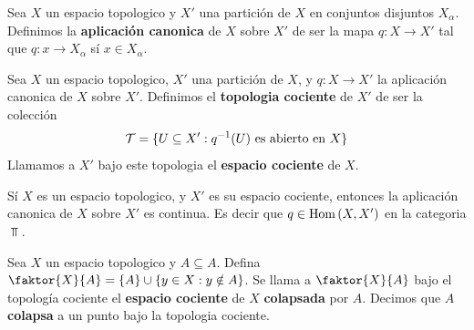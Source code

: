 \begin{definition}
    Sea $X$ un espacio topologico y $X'$ una partici\'on de $X$ en conjuntos
    disjuntos  $X_\alpha$. Definimos la  \textbf{aplicaci\'on canonica} de $X$
    sobre  $X'$ de ser la mapa $q:X \xrightarrow{} X'$ tal que $q:x \xrightarrow{}
    X_\alpha$ s\'i $x \in X_\alpha$.
\end{definition}

\begin{definition}
    Sea $X$ un espacio topologico,  $X'$ una partici\'on de  $X$, y  $q:X
    \xrightarrow{} X'$ la aplicaci\'on canonica de $X$ sobre $X'$. Definimos el
    \textbf{topologia cociente} de $X'$ de ser la colecci\'on
    \begin{equation*}
        \mathcal{T}=\{U \subseteq X' : q^{-1}(U) \text{ es abierto en } X\}
    \end{equation*}
    Llamamos a $X'$ bajo este topologia el  \textbf{espacio cociente} de $X$.
\end{definition}

\begin{lemma}\label{lemma_8.14}
    S\'i $X$ es un espacio topologico, y  $X'$ es su espacio cociente, entonces
    la aplicaci\'on canonica de  $X$ sobre  $X'$ es continua. Es decir que $q
    \in \operatorname{Hom}{(X,X')}$ en la categoria $\Top$.
\end{lemma}

\begin{definition}
    Sea $X$ un espacio topologico y  $A \subseteq A$. Defina
    $\faktor{X}{A}=\{A\} \cup \{y \in X : y \notin A\}$. Se llama a
    $\faktor{X}{A}$ bajo el topolog\'ia cociente el \textbf{espacio cociente} de
    $X$  \textbf{colapsada} por $A$. Decimos que $A$ \textbf{colapsa} a un punto
    bajo la topologia cociente.
\end{definition}

